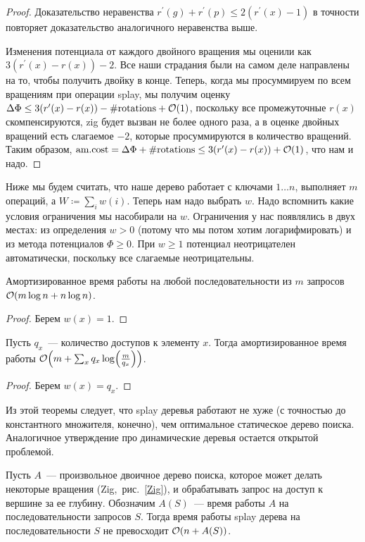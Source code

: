 \begin{proof}
	Доказательство неравенства $r^\prime(g) + r^\prime(p) \leq 2(r^\prime(x) - 1)$ в точности повторяет доказательство аналогичного неравенства выше.

	Изменения потенциала от каждого двойного вращения мы оценили как $3(r^\prime(x) - r(x)) - 2$. Все наши страдания были на самом деле направлены на то, чтобы получить двойку в конце. Теперь, когда мы просуммируем по всем вращениям при операции splay, мы получим оценку $\Delta\Phi \leq 3(r^\prime(x) - r(x)) - \#\text{rotations} + \mathcal{O}(1)$, поскольку все промежуточные $r(x)$ скомпенсируются, zig будет вызван не более одного раза, а в оценке двойных вращений есть слагаемое $-2$, которые просуммируются в количество вращений. Таким образом, $\text{am.cost} = \Delta\Phi + \#\text{rotations} \leq 3(r^\prime(x) - r(x)) + \mathcal{O}(1)$, что нам и надо.
\end{proof}

Ниже мы будем считать, что наше дерево работает с ключами $1 \ldots n$, выполняет $m$ операций, а $W \coloneqq \sum_i w(i)$. Теперь нам надо выбрать $w$. Надо вспомнить какие условия ограничения мы насобирали на $w$. Ограничения у нас появлялись в двух местах: из определения $w > 0$ (потому что мы потом хотим логарифмировать) и из метода потенциалов $\Phi \geq 0$. При $w \geq 1$ потенциал неотрицателен автоматически, поскольку все слагаемые неотрицательны.

\begin{corollary}
	Амортизированное время работы на любой последовательности из $m$ запросов $\BigO \parens*{m \log n + n \log n}$.
\end{corollary}
\begin{proof}
	Берем $w(x) = 1$.
\end{proof}

\begin{corollary}
	Пусть $q_x$~--- количество доступов к элементу $x$. Тогда амортизированное время работы $\BigO \parens*{m + \sum_x q_x \log \parens*{\frac{m}{q_x}}}$.
\end{corollary}
\begin{proof}
	Берем $w(x) = q_x$.
\end{proof}

Из этой теоремы следует, что splay деревья работают не хуже (с точностью до константного множителя, конечно), чем оптимальное статическое дерево поиска. Аналогичное утверждение про динамические деревья остается открытой проблемой.

\begin{conjecture}
	Пусть $A$~--- произвольное двоичное дерево поиска, которое может делать некоторые вращения (Zig,~рис.~\ref{Zig}), и обрабатывать запрос на доступ к вершине за ее глубину. Обозначим $A(S)$~--- время работы $A$ на последовательности запросов $S$. Тогда время работы splay дерева на последовательности $S$ не превосходит $\BigO \parens*{n + A(S)}$.
\end{conjecture}

